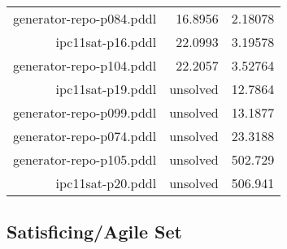 \documentclass{article}
\begin{document}
\begin{center}
\begin{tabular}{r|r|r}
 generator-repo-p084.pddl&16.8956&2.18078\\
 ipc11sat-p16.pddl&22.0993&3.19578\\
 generator-repo-p104.pddl&22.2057&3.52764\\
 ipc11sat-p19.pddl&unsolved&12.7864\\
 generator-repo-p099.pddl&unsolved&13.1877\\
 generator-repo-p074.pddl&unsolved&23.3188\\
 generator-repo-p105.pddl&unsolved&502.729\\
 ipc11sat-p20.pddl&unsolved&506.941
                            \end{tabular}
                            \end{center}
                    

                    \subsection*{Satisficing/Agile Set}
                    
\end{document}
